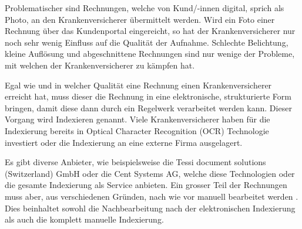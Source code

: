 \documentclass{hwz}
\begin{document}
Problematischer sind Rechnungen, welche von Kund/-innen digital, sprich als Photo, an den Krankenversicherer übermittelt werden. Wird ein Foto einer Rechnung über das Kundenportal eingereicht, so hat der Krankenversicherer nur noch sehr wenig Einfluss auf die Qualität der Aufnahme. Schlechte Belichtung, kleine Auflösung und abgeschnittene Rechnungen sind nur wenige der Probleme, mit welchen der Krankenversicherer zu kämpfen hat.

Egal wie und in welcher Qualität eine Rechnung einen Krankenversicherer erreicht hat, muss dieser die Rechnung in eine elektronische, strukturierte Form bringen, damit diese dann durch ein Regelwerk verarbeitet werden kann. Dieser Vorgang wird Indexieren genannt. Viele Krankenversicherer haben für die Indexierung bereits in Optical Character Recognition (OCR) Technologie investiert oder die Indexierung an eine externe Firma ausgelagert. 


Es gibt diverse Anbieter, wie beispielsweise die Tessi document solutions (Switzerland) GmbH oder die Cent Systems AG, welche diese Technologien oder die gesamte Indexierung als Service anbieten. Ein grosser Teil der Rechnungen muss aber, aus verschiedenen Gründen, nach wie vor manuell bearbeitet werden . Dies beinhaltet sowohl die Nachbearbeitung nach der elektronischen Indexierung als auch die komplett manuelle Indexierung. %


\end{document}
